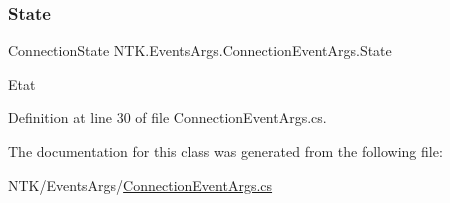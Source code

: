 \subsubsection{\texorpdfstring{State}{State}}
{\footnotesize\ttfamily Connection\+State N\+T\+K.\+Events\+Args.\+Connection\+Event\+Args.\+State\hspace{0.3cm}{\ttfamily [get]}}



Etat 



Definition at line 30 of file Connection\+Event\+Args.\+cs.



The documentation for this class was generated from the following file\+:\begin{DoxyCompactItemize}
\item 
N\+T\+K/\+Events\+Args/\mbox{\hyperlink{_connection_event_args_8cs}{Connection\+Event\+Args.\+cs}}\end{DoxyCompactItemize}
